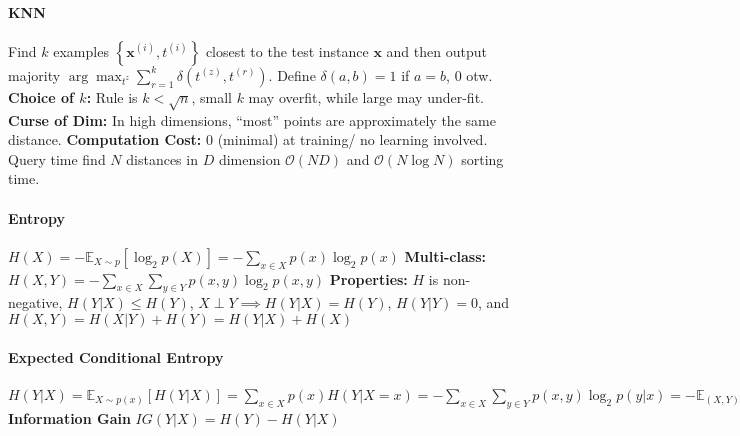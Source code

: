 \documentclass[10pt]{article}
\newcommand{\bx}{\mathbf{x}}
\begin{document}
\abovedisplayskip=-0.1cm
\abovedisplayshortskip=-0.2cm
\belowdisplayskip=-0.1cm
\belowdisplayshortskip=0.4cm

\paragraph{KNN} Find $k$ examples $\left\{ \bx^{(i)}, t^{(i)} \right\}$ closest to the test instance $\bx$ and then output majority $\arg \max_{t^{z}} \sum_{r = 1}^k \delta (t^{(z)}, t^{(r)})$. Define $\delta (a, b) = 1$ if $a = b$, $0$ otw. \textbf{Choice of $k$:} Rule is $k < \sqrt{n}$, small $k$ may overfit, while large may under-fit. \textbf{Curse of Dim:} In high dimensions, ``most'' points are approximately the same distance. \textbf{Computation Cost:} 0 (minimal) at training/ no learning involved. Query time find $N$ distances in $D$ dimension $\mathcal{O}(ND)$ and $\mathcal{O}(N \log N)$ sorting time.
\paragraph{Entropy} $H(X)=-\mathbb{E}_{X \sim p}\left[\log _{2} p(X)\right]=-\sum_{x \in X} p(x) \log _{2} p(x)$ \textbf{ Multi-class: } $H(X, Y)=-\sum_{x \in X} \sum_{y \in Y} p(x, y) \log _{2} p(x, y)$ \textbf{ Properties: } $H$ is non-negative, $H(Y|X) \leq H(Y)$, $X\perp Y \implies H(Y|X) = H(Y)$, $H(Y|Y) = 0$, and $H(X,Y) = H(X|Y) + H(Y) = H(Y|X) + H(X)$
\paragraph{Expected Conditional Entropy} $ H(Y | X) =\mathbb{E}_{X \sim p(x)}[H(Y | X)] =\sum_{x \in X} p(x) H(Y | X=x) =-\sum_{x \in X} \sum_{y \in Y} p(x, y) \log _{2} p(y | x) =-\mathbb{E}_{(X, Y) \sim p(x, y)}\left[\log _{2} p(Y | X)\right]$ \textbf{Information Gain} $IG(Y | X)=H(Y)-H(Y | X)$ 
\end{document}
